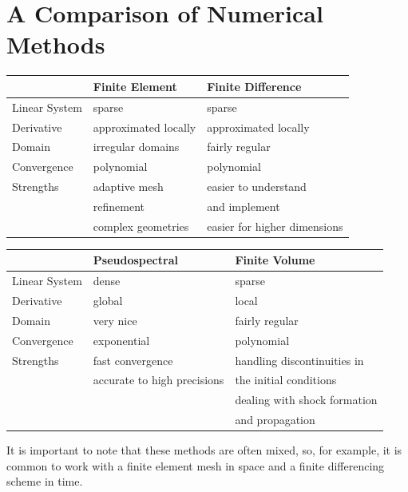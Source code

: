 \section*{A Comparison of Numerical Methods}

\begin{table}[t]
  \begin{tabular}{ l |l l }
     & Finite Element & Finite Difference  \\ \hline
    Linear System& sparse& sparse  \\
   Derivative & approximated locally & approximated locally \\
Domain & irregular domains & fairly regular\\
Convergence & polynomial & polynomial \\
Strengths & adaptive mesh & easier to understand \\
& refinement & and implement \\
& complex geometries & easier for higher dimensions \\
    \hline
  \end{tabular}
\end{table}

\begin{table}
  \begin{tabular}{ l |l l }
      & Pseudospectral & Finite Volume \\ \hline
    Linear System & dense & sparse \\
   Derivative & global & local\\
Domain  & very nice & fairly regular\\
Convergence  & exponential & polynomial\\
Strengths  & fast convergence & handling discontinuities in \\
& accurate to high precisions &the initial conditions \\
& & dealing with shock formation \\
& & and propagation \\
    \hline
  \end{tabular}
\end{table}

It is important to note that these methods are often mixed, so, for example, it is common to work with a finite element mesh in space and a finite differencing scheme in time.
